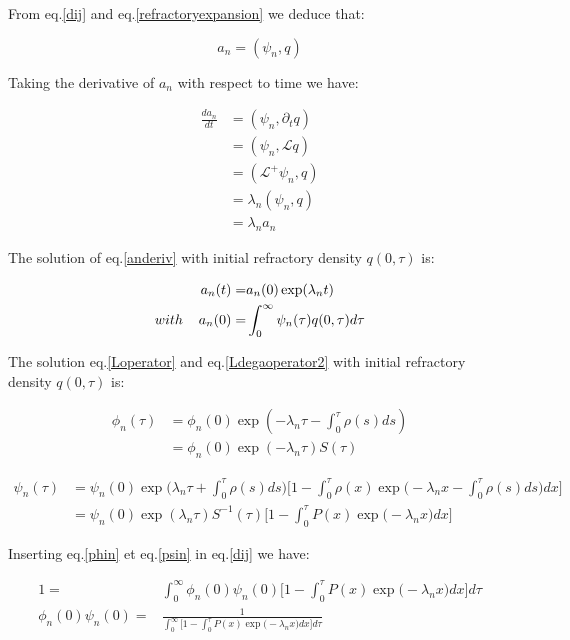 \documentclass[a4paper,12pt,twoside]{article}
\def \be {\begin{equation}}
\def \ee {\end{equation}}
\begin{document}
From eq.\eqref{dij} and eq.\eqref{refractoryexpansion} we deduce that:

\be
\label{an}
a_n=(\psi_n,q)
\ee

Taking the derivative of $a_n$ with respect to time we have:

\begin{align}
\label{anderiv}
\frac{d a_n}{dt}&=(\psi_n,\partial_tq) \nonumber \\
&=(\psi_n,\mathcal{L}q)  \nonumber \\
&=(\mathcal{L}^+\psi_n,q) \nonumber \\
&=\lambda_n(\psi_n,q) \nonumber \\
&=\lambda_na_n
\end{align}

The solution of eq.\eqref{anderiv} with initial refractory density $q(0,\tau)$ is:

\begin{align}
\label{ant}
a_n(t) = &a_n(0)\exp(\lambda_nt)\\
with \hspace{0.4cm} a_n(0) = & \int_{0}^{\infty}\psi_n(\tau)q(0,\tau)d\tau
\end{align}

The solution eq.\eqref{Loperator}  and eq.\eqref{Ldegaoperator2} with initial refractory density $q(0,\tau)$ is:

\begin{align}
\label{phin}
\phi_n(\tau)&=\phi_n(0)\exp(-\lambda_n\tau-\int_0^\tau\rho(s)ds)\nonumber\\
				  &=\phi_n(0)\exp(-\lambda_n\tau)S(\tau)
\end{align}

\begin{align}
\label{psin}
\psi_n(\tau)&=\psi_n(0)\exp\big(\lambda_n\tau+\int_0^\tau\rho(s)ds\big)\nonumber\big[1-\int^\tau_0 \rho(x) \exp\big(-\lambda_nx-\int_0^\tau\rho(s)ds\big)dx\big]\\
&=\psi_n(0)\exp(\lambda_n\tau)S^{-1}(\tau)\big[1-\int^\tau_0 P(x) \exp\big(-\lambda_nx)dx\big]
\end{align}



Inserting eq.\eqref{phin} et eq.\eqref{psin} in eq.\ref{dij} we have:

\begin{align}
1=&\int_0^{\infty}\phi_n(0)\psi_n(0)\big[1-\int^\tau_0 P(x) \exp\big(-\lambda_nx)dx\big]d\tau \\
\phi_n(0)\psi_n(0) =&\frac{1}{\int_0^{\infty}\big[1-\int^\tau_0 P(x) \exp\big(-\lambda_nx)dx\big]d\tau}
\end{align}
\end{document}
